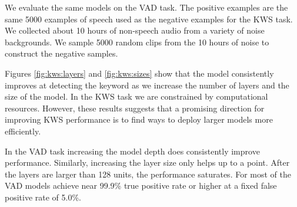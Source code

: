 We evaluate the same models on the VAD task. The positive examples are the same
5000 examples of speech used as the negative examples for the KWS task. We
collected about 10 hours of non-speech audio from a variety of noise
backgrounds. We sample 5000 random clips from the 10 hours of noise to
construct the negative samples.

Figures \ref{fig:kws:layers} and \ref{fig:kws:sizes} show that the model
consistently improves at detecting the keyword as we increase the number of
layers and the size of the model. In the KWS task we are constrained by
computational resources. However, these results suggests that a promising
direction for improving KWS performance is to find ways to deploy larger models
more efficiently. 

In the VAD task increasing the model depth does consistently improve
performance. Similarly, increasing the layer size only helps up to a point.
After the layers are larger than 128 units, the performance saturates. For most
of the VAD models achieve near 99.9\% true positive rate or higher at a fixed
false positive rate of 5.0\%.

